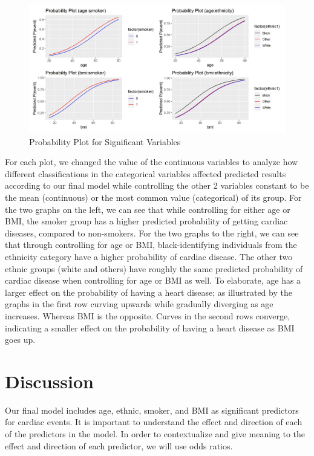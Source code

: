 \documentclass[12pt]{article}
\begin{document}
\begin{figure}[!ht]
    \centering
    \includegraphics[width=\textwidth]{Img/prob_plot.jpg}
    \caption{Probability Plot for Significant Variables}
\end{figure}


For each plot, we changed the value of the continuous variables to analyze how different classifications in the categorical variables affected predicted results according to our final model while controlling the other 2 variables constant to be the mean (continuous) or the most common value (categorical) of its group. For the two graphs on the left, we can see that while controlling for either age or BMI, the smoker group has a higher predicted probability of getting cardiac diseases, compared to non-smokers. For the two graphs to the right, we can see that through controlling for age or BMI, black-identifying individuals from the ethnicity category have a higher probability of cardiac disease. The other two ethnic groups (white and others) have roughly the same predicted probability of cardiac disease when controlling for age or BMI as well. To elaborate, age has a larger effect on the probability of having a heart disease; as illustrated by the graphs in the first row curving upwards while gradually diverging as age increases. Whereas BMI is the opposite. Curves in the second rows converge, indicating a smaller effect on the probability of having a heart disease as BMI goes up.


\section*{Discussion}
Our final model includes age, ethnic, smoker, and BMI as significant predictors for cardiac events. It is important to understand the effect and direction of each of the predictors in the model. In order to contextualize and give meaning to the effect and direction of each predictor, we will use odds ratios. 
\end{document}

